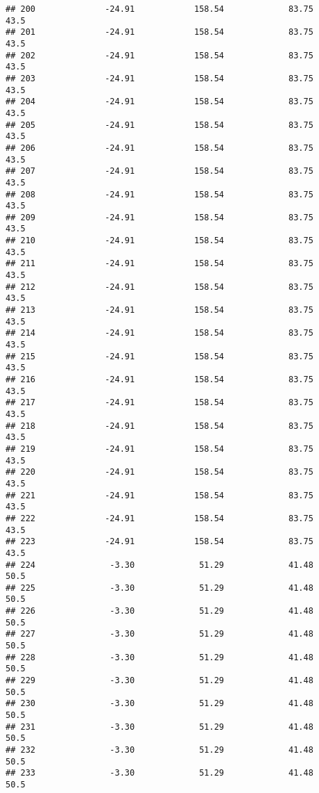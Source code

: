 \documentclass[]{article}
\begin{document}
\begin{verbatim}
## 200              -24.91            158.54             83.75           43.5
## 201              -24.91            158.54             83.75           43.5
## 202              -24.91            158.54             83.75           43.5
## 203              -24.91            158.54             83.75           43.5
## 204              -24.91            158.54             83.75           43.5
## 205              -24.91            158.54             83.75           43.5
## 206              -24.91            158.54             83.75           43.5
## 207              -24.91            158.54             83.75           43.5
## 208              -24.91            158.54             83.75           43.5
## 209              -24.91            158.54             83.75           43.5
## 210              -24.91            158.54             83.75           43.5
## 211              -24.91            158.54             83.75           43.5
## 212              -24.91            158.54             83.75           43.5
## 213              -24.91            158.54             83.75           43.5
## 214              -24.91            158.54             83.75           43.5
## 215              -24.91            158.54             83.75           43.5
## 216              -24.91            158.54             83.75           43.5
## 217              -24.91            158.54             83.75           43.5
## 218              -24.91            158.54             83.75           43.5
## 219              -24.91            158.54             83.75           43.5
## 220              -24.91            158.54             83.75           43.5
## 221              -24.91            158.54             83.75           43.5
## 222              -24.91            158.54             83.75           43.5
## 223              -24.91            158.54             83.75           43.5
## 224               -3.30             51.29             41.48           50.5
## 225               -3.30             51.29             41.48           50.5
## 226               -3.30             51.29             41.48           50.5
## 227               -3.30             51.29             41.48           50.5
## 228               -3.30             51.29             41.48           50.5
## 229               -3.30             51.29             41.48           50.5
## 230               -3.30             51.29             41.48           50.5
## 231               -3.30             51.29             41.48           50.5
## 232               -3.30             51.29             41.48           50.5
## 233               -3.30             51.29             41.48           50.5

\end{verbatim}
\end{document}
